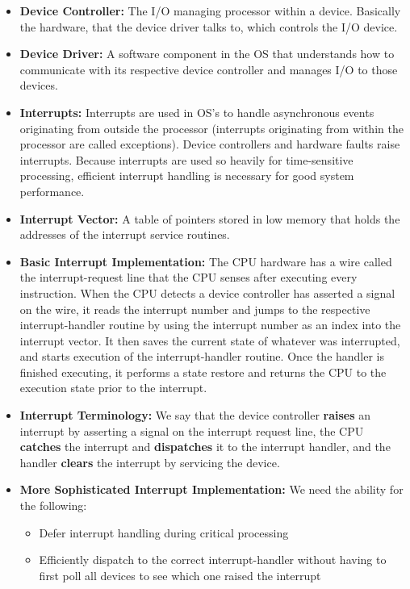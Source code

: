 \documentclass[12pt]{article}
\begin{document}
\begin{itemize}
    \item \textbf{Device Controller:} The I/O managing processor within a device. Basically the hardware, that the device driver talks to, which controls the I/O device.
    \item \textbf{Device Driver:} A software component in the OS that understands how to communicate with its respective device controller and manages I/O to those devices.
    \item \textbf{Interrupts:} Interrupts are used in OS's to handle asynchronous events originating from outside the processor (interrupts originating from within the processor are called exceptions). Device controllers and hardware faults raise interrupts. Because interrupts are used so heavily for time-sensitive processing, efficient interrupt handling is necessary for good system performance.
    \item \textbf{Interrupt Vector:} A table of pointers stored in low memory that holds the addresses of the interrupt service routines.
    \item \textbf{Basic Interrupt Implementation:} The CPU hardware has a wire called the interrupt-request line that the CPU senses after executing every instruction. When the CPU detects a device controller has asserted a signal on the wire, it reads the interrupt number and jumps to the respective interrupt-handler routine by using the interrupt number as an index into the interrupt vector. It then saves the current state of whatever was interrupted, and starts execution of the interrupt-handler routine. Once the handler is finished executing, it performs a state restore and returns the CPU to the execution state prior to the interrupt.
    \item \textbf{Interrupt Terminology:} We say that the device controller \textbf{raises} an interrupt by asserting a signal on the interrupt request line, the CPU \textbf{catches} the interrupt and \textbf{dispatches} it to the interrupt handler, and the handler \textbf{clears} the interrupt by servicing the device.
    \item \textbf{More Sophisticated Interrupt Implementation:} We need the ability for the following:
        \begin{itemize}
            \item Defer interrupt handling during critical processing
            \item Efficiently dispatch to the correct interrupt-handler without having to first poll all devices to see which one raised the interrupt

\end{itemize}
\end{itemize}
\end{document}
